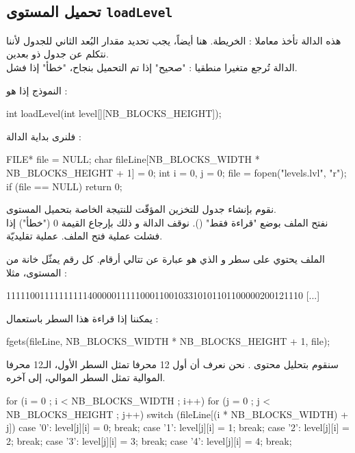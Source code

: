 \subsection{تحميل المستوى \texttt{loadLevel}}

هذه الدالة تأخذ معاملا : الخريطة. هنا أيضاً، يجب تحديد مقدار البُعد الثاني للجدول لأننا نتكلم عن جدول ذو بعدين.\\
الدالة تُرجع متغيرا منطقيا : "صحيح" إذا تم التحميل بنجاح، "خطأ" إذا فشل.

النموذج إذا هو :

\begin{Csource}
int loadLevel(int level[][NB_BLOCKS_HEIGHT]);
\end{Csource}

فلنرى بداية الدالة :

\begin{Csource}
FILE* file = NULL;
char fileLine[NB_BLOCKS_WIDTH * NB_BLOCKS_HEIGHT + 1] = {0};
int i = 0, j = 0;
file = fopen("levels.lvl", "r");
if (file == NULL)
	return 0;
\end{Csource}

نقوم بإنشاء جدول للتخزين المؤقّت للنتيجة الخاصة بتحميل المستوى.\\
نفتح الملف بوضع "قراءة فقط"
().
نوقف الدالة و ذلك بإرجاع القيمة 0 ("خطأ") إذا فشلت عملية فتح الملف. عملية تقليديّة.

الملف
يحتوي على سطر و الذي هو عبارة عن تتالي أرقام. كل رقم يمثّل خانة من المستوى، مثلا :

\begin{Console}
11111001111111111400000111110001100103310101101100000200121110 [...]
\end{Console}

يمكننا إذا قراءة هذا السطر باستعمال
 :

\begin{Csource}
fgets(fileLine, NB_BLOCKS_WIDTH * NB_BLOCKS_HEIGHT + 1, file);
\end{Csource}

سنقوم بتحليل محتوى
.
نحن نعرف أن أول 12 محرفا تمثل السطر الأول، الـ12 محرفا الموالية تمثل السطر الموالي، إلى آخره.

\begin{Csource}
for (i = 0 ; i < NB_BLOCKS_WIDTH ; i++)
{
	for (j = 0 ; j < NB_BLOCKS_HEIGHT ; j++)
	{
		switch (fileLine[(i * NB_BLOCKS_WIDTH) + j])
		{
			case '0':
			level[j][i] = 0;
			break;
			case '1':
			level[j][i] = 1;
			break;
			case '2':
			level[j][i] = 2;
			break;
			case '3':
			level[j][i] = 3;
			break;
			case '4':
			level[j][i] = 4;
			break;
		}
	}
}
\end{Csource}


